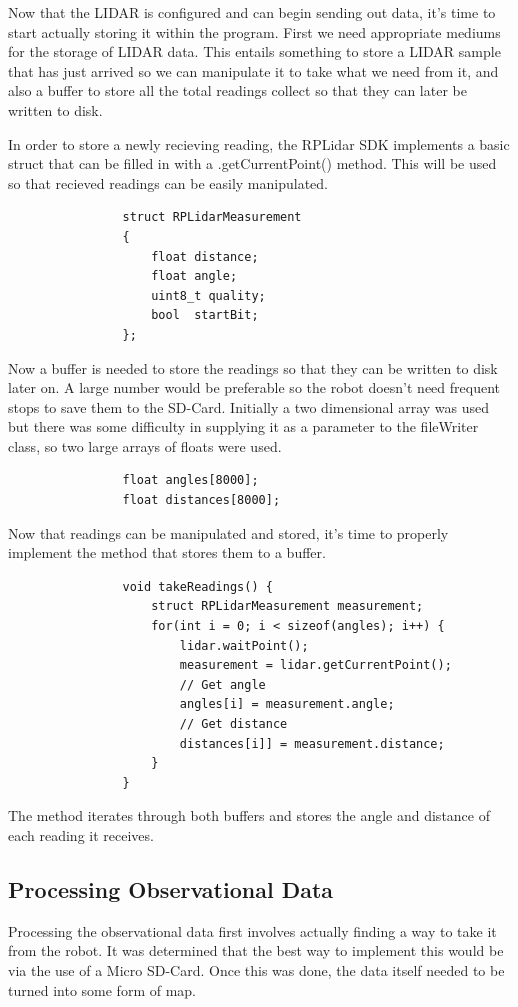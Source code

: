 				Now that the LIDAR is configured and can begin sending out data, it's time to start actually storing it within the program. First we need appropriate mediums for the storage of LIDAR data. This entails something to store a LIDAR sample that has just arrived so we can manipulate it to take what we need from it, and also a buffer to store all the total readings collect so that they can later be written to disk. 
				
				In order to store a newly recieving reading, the RPLidar SDK implements a basic struct that can be filled in with a .getCurrentPoint() method. This will be used so that recieved readings can be easily manipulated.
				\begin{lstlisting}
				struct RPLidarMeasurement
				{
					float distance;
					float angle;
					uint8_t quality;
					bool  startBit;
				};
				\end{lstlisting}
				
				Now a buffer is needed to store the readings so that they can be written to disk later on. A large number would be preferable so the robot doesn't need frequent stops to save them to the SD-Card. Initially a two dimensional array was used but there was some difficulty in supplying it as a parameter to the fileWriter class, so two large arrays of floats were used.
				\begin{lstlisting}
				float angles[8000];
				float distances[8000];
				\end{lstlisting}
				
				Now that readings can be manipulated and stored, it's time to properly implement the method that stores them to a buffer.
				\begin{lstlisting}
				void takeReadings() {
					struct RPLidarMeasurement measurement;
					for(int i = 0; i < sizeof(angles); i++) {
						lidar.waitPoint();
						measurement = lidar.getCurrentPoint();
						// Get angle
						angles[i] = measurement.angle;
						// Get distance
						distances[i]] = measurement.distance;
					}
				}
				\end{lstlisting}
				The method iterates through both buffers and stores the angle and distance of each reading it receives.		
				
			\subsection{Processing Observational Data}
			Processing the observational data first involves actually finding a way to take it from the robot. It was determined that the best way to implement this would be via the use of a Micro SD-Card. Once this was done, the data itself needed to be turned into some form of map.
			
